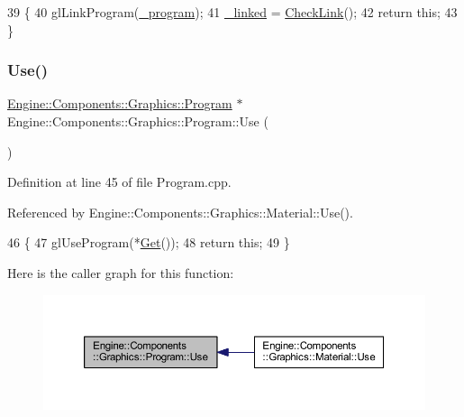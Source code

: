 \begin{DoxyCode}
39 \{
40     glLinkProgram(\mbox{\hyperlink{classEngine_1_1Components_1_1Graphics_1_1Program_a23fb9432b8cd14e9cfa27e23f483712d}{\_program}});
41     \mbox{\hyperlink{classEngine_1_1Components_1_1Graphics_1_1Program_abd46071ffae3fccf2730393cecad9646}{\_linked}} = \mbox{\hyperlink{classEngine_1_1Components_1_1Graphics_1_1Program_a1f4c378d3e4663b0a41bb0c2ad4ace3f}{CheckLink}}();
42     \textcolor{keywordflow}{return} \textcolor{keyword}{this};
43 \}
\end{DoxyCode}
\mbox{\label{classEngine_1_1Components_1_1Graphics_1_1Program_aed02e665619dda6c6cf80e03cb1f1543}} 
\subsubsection{\texorpdfstring{Use()}{Use()}}
{\footnotesize\ttfamily \mbox{\hyperlink{classEngine_1_1Components_1_1Graphics_1_1Program}{Engine\+::\+Components\+::\+Graphics\+::\+Program}} $\ast$ Engine\+::\+Components\+::\+Graphics\+::\+Program\+::\+Use (\begin{DoxyParamCaption}{ }\end{DoxyParamCaption})}



Definition at line 45 of file Program.\+cpp.



Referenced by Engine\+::\+Components\+::\+Graphics\+::\+Material\+::\+Use().


\begin{DoxyCode}
46 \{
47     glUseProgram(*\mbox{\hyperlink{classEngine_1_1Components_1_1Graphics_1_1Program_a2f8a229f633939c001fcfc46f7b7fd0b}{Get}}());
48     \textcolor{keywordflow}{return} \textcolor{keyword}{this};
49 \}
\end{DoxyCode}
Here is the caller graph for this function\+:
\nopagebreak
\begin{figure}[H]
\begin{center}
\leavevmode
\includegraphics[width=350pt]{classEngine_1_1Components_1_1Graphics_1_1Program_aed02e665619dda6c6cf80e03cb1f1543_icgraph}
\end{center}
\end{figure}


